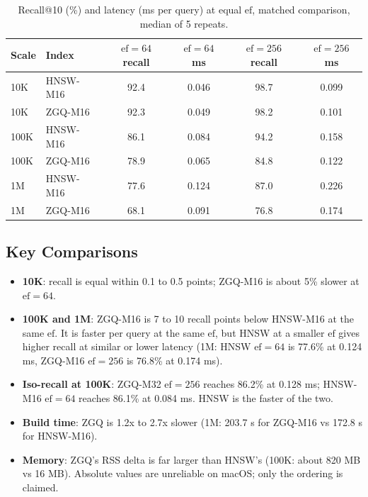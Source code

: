 \documentclass[11pt,a4paper]{article}
\newcommand{\ef}{\text{ef}}
\begin{document}
\begin{table}[h]
\centering
\caption{Recall@10 (\%) and latency (ms per query) at equal $\ef$, matched comparison, median of 5 repeats.}
\label{tab:results}
\begin{tabular}{llcccc}
\toprule
\textbf{Scale} & \textbf{Index} & \textbf{$\ef=64$ recall} & \textbf{$\ef=64$ ms} & \textbf{$\ef=256$ recall} & \textbf{$\ef=256$ ms} \\
\midrule
10K & HNSW-M16 & 92.4 & 0.046 & 98.7 & 0.099 \\
10K & ZGQ-M16 & 92.3 & 0.049 & 98.2 & 0.101 \\
100K & HNSW-M16 & 86.1 & 0.084 & 94.2 & 0.158 \\
100K & ZGQ-M16 & 78.9 & 0.065 & 84.8 & 0.122 \\
1M & HNSW-M16 & 77.6 & 0.124 & 87.0 & 0.226 \\
1M & ZGQ-M16 & 68.1 & 0.091 & 76.8 & 0.174 \\
\bottomrule
\end{tabular}
\end{table}

\subsection{Key Comparisons}

\begin{tcolorbox}[title=Reading of the matched comparison, colback=gray!5]
\begin{itemize}
    \item \textbf{10K}: recall is equal within 0.1 to 0.5 points; ZGQ-M16 is about 5\% slower at $\ef=64$.
    \item \textbf{100K and 1M}: ZGQ-M16 is 7 to 10 recall points below HNSW-M16 at the same $\ef$. It is faster per query at the same $\ef$, but HNSW at a smaller $\ef$ gives higher recall at similar or lower latency (1M: HNSW $\ef=64$ is 77.6\% at 0.124 ms, ZGQ-M16 $\ef=256$ is 76.8\% at 0.174 ms).
    \item \textbf{Iso-recall at 100K}: ZGQ-M32 $\ef=256$ reaches 86.2\% at 0.128 ms; HNSW-M16 $\ef=64$ reaches 86.1\% at 0.084 ms. HNSW is the faster of the two.
    \item \textbf{Build time}: ZGQ is 1.2x to 2.7x slower (1M: 203.7 s for ZGQ-M16 vs 172.8 s for HNSW-M16).
    \item \textbf{Memory}: ZGQ's RSS delta is far larger than HNSW's (100K: about 820 MB vs 16 MB). Absolute values are unreliable on macOS; only the ordering is claimed.
\end{itemize}
\end{tcolorbox}
\end{document}
